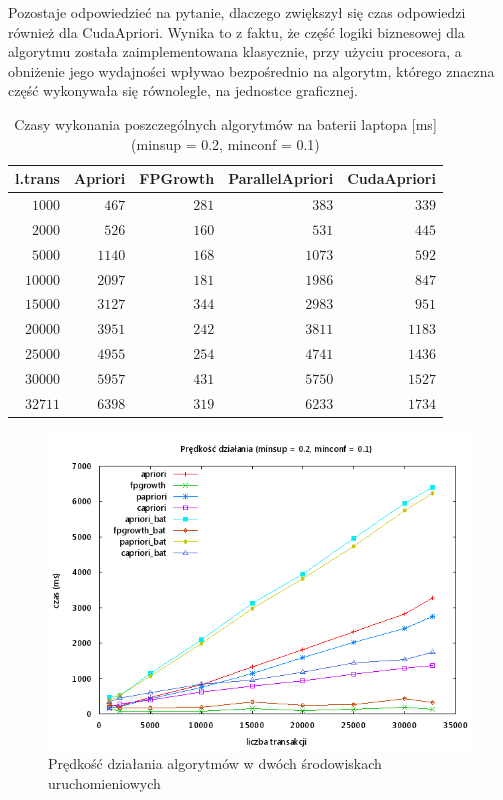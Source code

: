 Pozostaje odpowiedzieć na pytanie, dlaczego zwiększył się czas odpowiedzi również dla CudaApriori. Wynika to z faktu, że część logiki biznesowej dla algorytmu została zaimplementowana klasycznie, przy użyciu procesora, a obniżenie jego wydajności wpływao bezpośrednio na algorytm, którego znaczna część wykonywała się równolegle, na jednostce graficznej.

\begin{table}
	\centering
	\begin{tabular}{r|r|r|r|r}
	\textbf{l.trans} & \textbf{Apriori} & \textbf{FPGrowth} & \textbf{ParallelApriori} & \textbf{CudaApriori}  \\ \hline
	$1000$ & $467$ & $281$ & $383$ & $339$ \\
	$2000$ & $526$ & $160$ & $531$ & $445$ \\
	$5000$ & $1140$ & $168$ & $1073$ & $592$ \\
	$10000$ & $2097$ & $181$ & $1986$ & $847$ \\
	$15000$ & $3127$ & $344$ & $2983$ & $951$ \\
	$20000$ & $3951$ & $242$ & $3811$ & $1183$ \\
	$25000$ & $4955$ & $254$ & $4741$ & $1436$ \\
	$30000$ & $5957$ & $431$ & $5750$ & $1527$ \\
	$32711$ & $6398$ & $319$ & $6233$ & $1734$ \\
	\end{tabular}
	\caption{Czasy wykonania poszczególnych algorytmów na baterii laptopa [ms] (minsup = 0.2, minconf = 0.1)\label{tab:02_01_bat}}
\end{table}

\begin{figure}[H]
\centering
\includegraphics[width=1.1\textwidth]{figures/06/02_01_all.png}
\caption{Prędkość działania algorytmów w dwóch środowiskach uruchomieniowych\label{rys:02_01_all}}
\end{figure}


